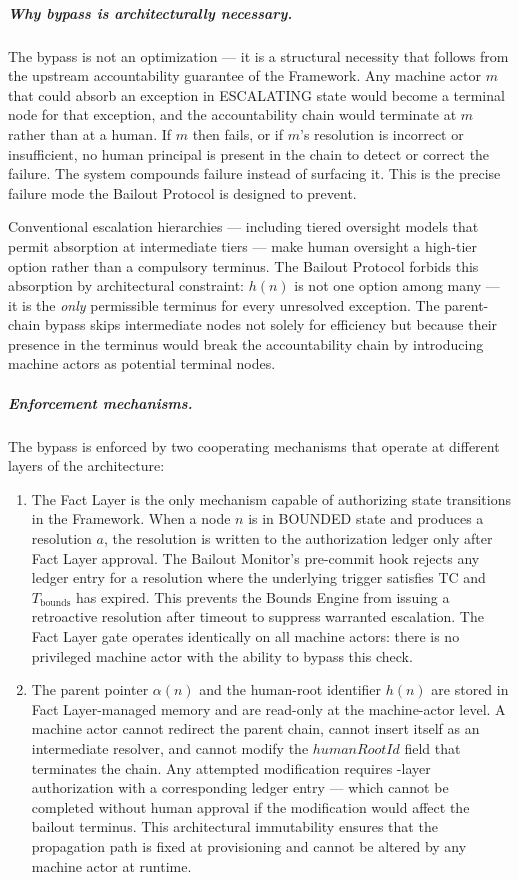 \subparagraph{Why bypass is architecturally necessary.} The bypass is not an optimization — it is a structural necessity that follows from the upstream accountability guarantee of the \bxthree{} Framework. Any machine actor $m$ that could absorb an exception in ESCALATING state would become a terminal node for that exception, and the accountability chain would terminate at $m$ rather than at a human. If $m$ then fails, or if $m$'s resolution is incorrect or insufficient, no human principal is present in the chain to detect or correct the failure. The system compounds failure instead of surfacing it. This is the precise failure mode the Bailout Protocol is designed to prevent.

Conventional escalation hierarchies — including tiered oversight models that permit absorption at intermediate tiers — make human oversight a high-tier option rather than a compulsory terminus. The Bailout Protocol forbids this absorption by architectural constraint: $h(n)$ is not one option among many — it is the \emph{only} permissible terminus for every unresolved exception. The parent-chain bypass skips intermediate nodes not solely for efficiency but because their presence in the terminus would break the accountability chain by introducing machine actors as potential terminal nodes.

\subparagraph{Enforcement mechanisms.} The bypass is enforced by two cooperating mechanisms that operate at different layers of the \bxthree{} architecture:

\begin{enumerate}
\item[\textbf{Fact Layer gate (enforcement at the authorization layer).}] The Fact Layer is the only mechanism capable of authorizing state transitions in the \bxthree{} Framework. When a node $n$ is in BOUNDED state and produces a resolution $a$, the resolution is written to the authorization ledger only after Fact Layer approval. The Bailout Monitor's pre-commit hook rejects any ledger entry for a resolution where the underlying trigger satisfies TC and $T_{\text{bounds}}$ has expired. This prevents the Bounds Engine from issuing a retroactive resolution after timeout to suppress warranted escalation. The Fact Layer gate operates identically on all machine actors: there is no privileged machine actor with the ability to bypass this check.

\item[\textbf{Immutable parent-pointer and human-root architecture (enforcement at the data model layer).}] The parent pointer $\alpha(n)$ and the human-root identifier $h(n)$ are stored in Fact Layer-managed memory and are read-only at the machine-actor level. A machine actor cannot redirect the parent chain, cannot insert itself as an intermediate resolver, and cannot modify the $humanRootId$ field that terminates the chain. Any attempted modification requires \purpose-layer authorization with a corresponding ledger entry — which cannot be completed without human approval if the modification would affect the bailout terminus. This architectural immutability ensures that the propagation path is fixed at provisioning and cannot be altered by any machine actor at runtime.
\end{enumerate}

